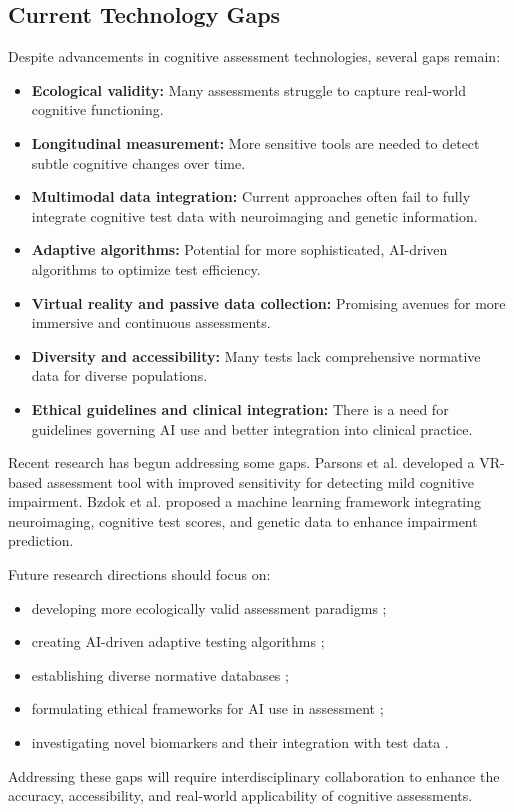 \subsection{Current Technology Gaps}
Despite advancements in cognitive assessment technologies, several gaps remain:
\begin{itemize}
\item \textbf{Ecological validity:} Many assessments struggle to capture real-world cognitive functioning.
\item \textbf{Longitudinal measurement:} More sensitive tools are needed to detect subtle cognitive changes over time.
\item \textbf{Multimodal data integration:} Current approaches often fail to fully integrate cognitive test data with neuroimaging and genetic information.
\item \textbf{Adaptive algorithms:} Potential for more sophisticated, AI-driven algorithms to optimize test efficiency.
\item \textbf{Virtual reality and passive data collection:} Promising avenues for more immersive and continuous assessments.
\item \textbf{Diversity and accessibility:} Many tests lack comprehensive normative data for diverse populations.
\item \textbf{Ethical guidelines and clinical integration:} There is a need for guidelines governing AI use and better integration into clinical practice.
\end{itemize}
Recent research has begun addressing some gaps. Parsons et al. \cite{Parsons2021} developed a VR-based assessment tool with improved sensitivity for detecting mild cognitive impairment. Bzdok et al. \cite{Bzdok2020} proposed a machine learning framework integrating neuroimaging, cognitive test scores, and genetic data to enhance impairment prediction.

Future research directions should focus on:
\begin{itemize}
\item developing more ecologically valid assessment paradigms \cite{Parsons2021};
\item creating AI-driven adaptive testing algorithms \cite{Zorluoglu2020};
\item establishing diverse normative databases \cite{Gianfrancesco2018};
\item formulating ethical frameworks for AI use in assessment \cite{Birhane2021};
\item investigating novel biomarkers and their integration with test data \cite{Bzdok2020}.
\end{itemize}
Addressing these gaps will require interdisciplinary collaboration to enhance the accuracy, accessibility, and real-world applicability of cognitive assessments.

